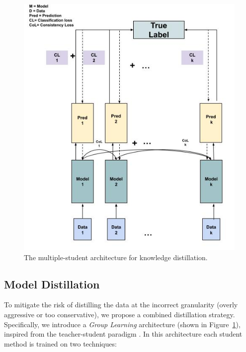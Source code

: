 \begin{figure}[t]
\center
\includegraphics[width=1\linewidth]{mainmatter/emnlp2021_gl/multiple_students_architecture.jpeg}
\caption{ The multiple-student architecture for knowledge distillation.}
\label{multiple_students_architecture}
\vspace{-7mm}
\end{figure}
\subsection{Model Distillation}

To mitigate the risk of distilling the data at the incorrect granularity (overly aggressive or too conservative), we propose a combined distillation strategy. Specifically, we introduce a \textit{Group Learning} architecture (shown in Figure~\ref{multiple_students_architecture}), inspired from the teacher-student paradigm \cite{hinton2015distilling,tarvainen2017mean,laine2016temporal,sajjadi2016regularization}. In this architecture each student method is trained on two techniques:


